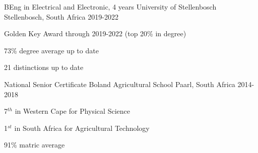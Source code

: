 

\begin{cventries}

  \cventry
    {BEng in Electrical and Electronic, 4 years} %
    {University of Stellenbosch} %
    {Stellenbosch, South Africa} %
    {2019-2022} %
    {
      \begin{cvitems} %
        \item {Golden Key Award through 2019-2022 (top 20\% in degree)}
        \item {73\% degree average up to date}
        \item {21 distinctions up to date}
      \end{cvitems}
    }
  \cventry
{National Senior Certificate} %
{Boland Agricultural School} %
{Paarl, South Africa} %
{2014-2018} %
{
	  \begin{cvitems} %
	  	\item {7$^{th}$ in Western Cape for Physical Science}
	  	\item {1$^{st}$ in South Africa for Agricultural Technology}
	  	\item {91\% matric average }
	  \end{cvitems}
}

\end{cventries}
